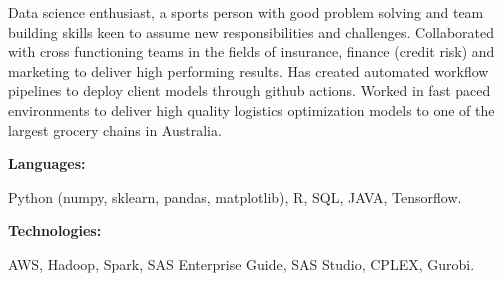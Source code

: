 \documentclass[9pt]{developercv} %
\begin{document}

\begin{minipage}[t]{0.46\textwidth}
	\vspace{-6pt}
 
	Data science enthusiast, a sports person with good problem solving and team building skills keen to assume new responsibilities and challenges. Collaborated with cross functioning teams in the fields of insurance, finance (credit risk) and marketing to deliver high performing results. Has created automated workflow pipelines to deploy client models through github actions. Worked in fast paced environments to deliver high quality logistics optimization models to one of the largest grocery chains in Australia.\\
\end{minipage}
\hfill %
\begin{minipage}[t]{0.465\textwidth}
    \vspace{-6pt}
    
    \begin{minipage}[t]{0.2\textwidth}
        \textbf{Languages:}
    \end{minipage}
    \hfill
    \begin{minipage}[t]{0.73\textwidth}
      Python (numpy, sklearn, pandas, matplotlib), R, SQL, JAVA, Tensorflow.  
    \end{minipage}
    \vspace{4mm}
    
    \begin{minipage}[t]{0.2\textwidth}
        \textbf{Technologies:}
    \end{minipage}
    \hfill
    \begin{minipage}[t]{0.73\textwidth}
      AWS, Hadoop, Spark, SAS Enterprise Guide, SAS Studio, CPLEX, Gurobi.
    \end{minipage}
    
\end{minipage}
\end{document}
